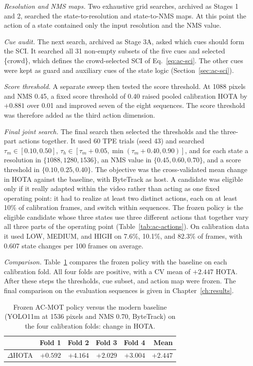 \emph{Resolution and NMS maps.} Two exhaustive grid searches, archived as Stages 1 and 2, searched the state-to-resolution and state-to-NMS maps. At this point the action of a state contained only the input resolution and the NMS value.

\emph{Cue audit.} The next search, archived as Stage 3A, asked which cues should form the SCI. It searched all 31 non-empty subsets of the five cues and selected \{crowd\}, which defines the crowd-selected SCI of Eq.~\eqref{eq:ac-sci}. The other cues were kept as guard and auxiliary cues of the state logic (Section~\ref{sec:ac-sci}).

\emph{Score threshold.} A separate sweep then tested the score threshold. At 1088 pixels and NMS 0.45, a fixed score threshold of 0.40 raised pooled calibration HOTA by $+0.881$ over 0.01 and improved seven of the eight sequences. The score threshold was therefore added as the third action dimension.

\emph{Final joint search.} The final search then selected the thresholds and the three-part actions together. It used 60 TPE trials (seed 43) and searched $\tau_m\in[0.10,0.50]$, $\tau_h\in[\tau_m+0.05,\min(\tau_m+0.40,0.90)]$, and for each state a resolution in $\{1088,1280,1536\}$, an NMS value in $\{0.45,0.60,0.70\}$, and a score threshold in $\{0.10,0.25,0.40\}$. The objective was the cross-validated mean change in HOTA against the baseline, with ByteTrack as host. A candidate was eligible only if it really adapted within the video rather than acting as one fixed operating point: it had to realize at least two distinct actions, each on at least 10\% of calibration frames, and switch within sequences. The frozen policy is the eligible candidate whose three states use three different actions that together vary all three parts of the operating point (Table~\ref{tab:ac-actions}). On calibration data it used LOW, MEDIUM, and HIGH on 7.6\%, 10.1\%, and 82.3\% of frames, with 0.607 state changes per 100 frames on average.

\emph{Comparison.} Table~\ref{tab:ac-folds} compares the frozen policy with the baseline on each calibration fold. All four folds are positive, with a CV mean of $+2.447$ HOTA. After these steps the thresholds, cue subset, and action map were frozen. The final comparison on the evaluation sequences is given in Chapter~\ref{ch:results}.

\begin{table}[tbp]
\centering
\caption{Frozen AC-MOT policy versus the modern baseline (YOLO11m at 1536 pixels and NMS 0.70, ByteTrack) on the four calibration folds: change in HOTA.}
\label{tab:ac-folds}
\begin{tabular}{lrrrrr}
\toprule
 & Fold 1 & Fold 2 & Fold 3 & Fold 4 & Mean\\
\midrule
$\Delta$HOTA & $+0.592$ & $+4.164$ & $+2.029$ & $+3.004$ & $+2.447$\\
\bottomrule
\end{tabular}
\end{table}


